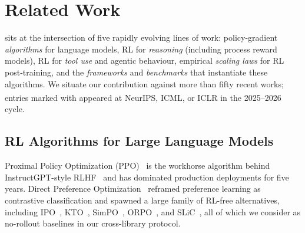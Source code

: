 
\section{Related Work}
\label{sec:related}

\ours{} sits at the intersection of five rapidly evolving lines of work:
policy-gradient \emph{algorithms} for language models, RL for \emph{reasoning}
(including process reward models), RL for \emph{tool use} and agentic behaviour,
empirical \emph{scaling laws} for RL post-training, and the \emph{frameworks}
and \emph{benchmarks} that instantiate these algorithms. We situate our
contribution against more than fifty recent works; entries marked with
\textsuperscript{\dag} appeared at NeurIPS, ICML, or ICLR in the 2025--2026 cycle.

\subsection{RL Algorithms for Large Language Models}
\label{sec:related:algos}

Proximal Policy Optimization (PPO)~\cite{schulman2017proximal} is the workhorse
algorithm behind InstructGPT-style RLHF~\cite{ouyang2022training, christiano2017deeprlhf, stiennon2020summarize, bai2022hhrlhf, bai2022claudecai}
and has dominated production deployments for five years. Direct Preference
Optimization~\cite{rafailov2024direct} reframed preference learning as
contrastive classification and spawned a large family of RL-free alternatives,
including IPO~\cite{azar2024ipo}, KTO~\cite{ethayarajh2024kto},
SimPO~\cite{meng2024simpo}, ORPO~\cite{hong2024orpo}, and
SLiC~\cite{zhao2023slic}, all of which we consider as no-rollout baselines in
our cross-library protocol.

